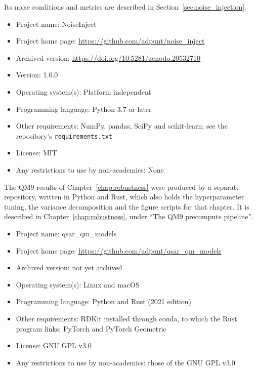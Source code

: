 Its noise conditions and metrics are described in Section~\ref{sec:noise_injection}.

\begin{itemize}
    \item Project name: NoiseInject
    \item Project home page: \url{https://github.com/adpunt/noise_inject}
    \item Archived version: \url{https://doi.org/10.5281/zenodo.20532710}
    \item Version: 1.0.0
    \item Operating system(s): Platform independent
    \item Programming language: Python 3.7 or later
    \item Other requirements: NumPy, pandas, SciPy and scikit-learn; see the repository's \texttt{requirements.txt}
    \item License: MIT
    \item Any restrictions to use by non-academics: None
\end{itemize}

The QM9 results of Chapter~\ref{chap:robustness} were produced by a separate repository, written in Python and Rust, which also holds the hyperparameter tuning, the variance decomposition and the figure scripts for that chapter. It is described in Chapter~\ref{chap:robustness}, under ``The QM9 precompute pipeline''.

\begin{itemize}
    \item Project name: qsar\_qm\_models
    \item Project home page: \url{https://github.com/adpunt/qsar_qm_models}
    \item Archived version: not yet archived
    \item Operating system(s): Linux and macOS
    \item Programming language: Python and Rust (2021 edition)
    \item Other requirements: RDKit installed through conda, to which the Rust program links; PyTorch and PyTorch Geometric
    \item License: GNU GPL v3.0
    \item Any restrictions to use by non-academics: those of the GNU GPL v3.0
\end{itemize}

